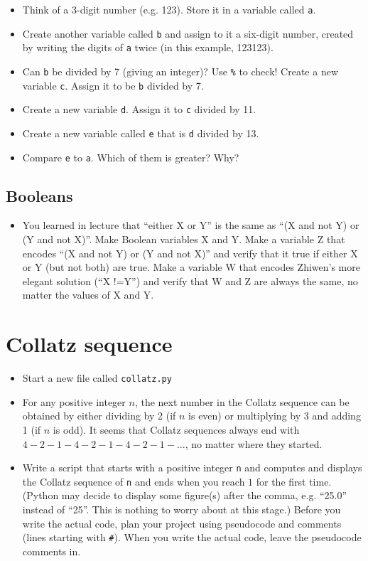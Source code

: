 \documentclass[pdflatex,a4paper]{article}
\begin{document}
\begin{itemize}
\item
Think of a 3-digit number (e.g. 123). Store it in a variable called \verb=a=. 
\item
Create another variable called \verb=b= and assign to it a six-digit number, created by writing the digits of \verb=a= twice (in this example, 123123). 
\item
Can \verb=b= be divided by 7 (giving an integer)?  Use \verb=%= to check!  Create a new variable \verb=c=. Assign it to be \verb=b= divided by 7.
\item
Create a new variable \verb=d=. Assign it to \verb=c= divided by 11.
\item
Create a new variable called \verb=e= that is \verb=d= divided by 13.
\item
Compare \verb=e= to \verb=a=. Which of them is greater? Why?
\end{itemize}

\subsection{Booleans}

\begin{itemize}
\item
You learned in lecture that ``either X or Y'' is the same as ``(X and not Y) or (Y and not X)''. Make Boolean variables X and Y. Make a variable Z that encodes ``(X and not Y) or (Y and not X)'' and verify that it true if either X or Y (but not both) are true. Make a variable W that encodes Zhiwen's more elegant solution (``X !=Y'') and verify that W and Z are always the same, no matter the values of X and Y. 
\end{itemize}

\section{Collatz sequence}

\begin{itemize}
\item
Start a new file called \verb=collatz.py=
\item
For any positive integer \(n\), the next number in the Collatz sequence can be obtained by either dividing by 2 (if \(n\) is even) or multiplying by 3 and adding 1 (if \(n\) is odd). It seems that Collatz sequences always end with \(4-2-1-4-2-1-4-2-1-\dots\), no matter where they started. 
\item
Write a script that starts with a positive integer \verb=n= and computes and displays the Collatz sequence of \verb-n- and ends when you reach \(1\) for the first time. (Python may decide to display some figure(s) after the comma, e.g. ``25.0'' instead of ``25''. This is nothing to worry about at this stage.) Before you write the actual code, plan your project using pseudocode and comments (lines starting with \verb=#=). When you write the actual code, leave the pseudocode comments in.
\end{itemize}
\end{document}
